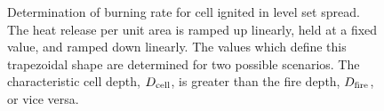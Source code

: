 \begin{figure}
    \begin{center}
        \caption[Determination of burning rate for cell ignited in level set spread]{\label{fig:LS_burning_rate} Determination of burning rate for cell ignited in level set spread. The heat release per unit area is ramped up linearly, held at a fixed value, and ramped down linearly. The values which define this trapezoidal shape are determined for two possible scenarios. The characteristic cell depth, $D_{\rm cell}$, is greater than the fire depth, $D_{\rm fire}$, or vice versa.}
    \end{center}
\end{figure}

